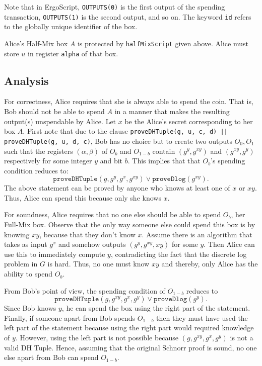 \documentclass[11pt]{article}
\newcommand{\langname}{ErgoScript\xspace}
\begin{document}
Note that in \langname, \texttt{OUTPUTS(0)} is the first output of the spending transaction, \texttt{OUTPUTS(1)} is the second output, and so on. The keyword \texttt{id} refers to the globally unique identifier of the box. 

Alice's Half-Mix box $A$ is protected by \texttt{halfMixScript} given above. Alice must store $u$ in register \texttt{alpha} of that box.


\subsection{Analysis}

For correctness, Alice requires that she is always able to spend the coin. That is, Bob should not be able to spend $A$ in a manner that makes the resulting output(s) unspendable by Alice.
Let $x$ be the Alice's secret corresponding to her box $A$. First note that due to the clause 
\texttt{proveDHTuple(g, u, c, d) || proveDHTuple(g, u, d, c)}, Bob has no choice but to create two outputs $O_0, O_1$ such that the registers $(\alpha, \beta)$ of $O_b$ and $O_{1-b}$ contain $(g^y, g^{xy})$ and $(g^{xy}, g^y)$ respectively for some integer $y$ and bit $b$. This implies that that $O_b$'s spending condition reduces to:
$$\texttt{proveDHTuple}(g, g^{y}, g^x, g^{xy}) \lor \texttt{proveDlog}(g^{xy}).$$ 
The above statement can be proved by anyone who knows at least one of $x$ or $xy$. 
Thus, Alice can spend this because only she knows $x$. 

For soundness, Alice requires that no one else should be able to spend $O_b$, her Full-Mix box. Observe that the only way someone else could spend this box is by knowing $xy$, because that they don't know $x$. Assume there is an algorithm that takes as input $g^x$ and somehow outputs $(g^y, g^{xy}, xy)$ for some $y$. Then Alice can use this to immediately compute $y$, contradicting the fact that the discrete log problem in $G$ is hard. Thus, no one must know $xy$ and thereby, only Alice has the ability to spend $O_b$.

From Bob's point of view, the spending condition of $O_{1-b}$ reduces to 
$$\texttt{proveDHTuple}(g, g^{xy}, g^x, g^{y}) \lor \texttt{proveDlog}(g^{y}).$$
Since Bob knows $y$, he can spend the box using the right part of the statement. Finally, if someone apart from Bob spends $O_{1-b}$ then they must have used the left part of the statement because using the right part would required knowledge of $y$. However, using the left part is not possible because $(g, g^{xy}, g^x, g^{y})$ is not a valid DH Tuple. Hence, assuming that the original Schnorr proof is sound, no one else apart from Bob can spend $O_{1-b}$.
\end{document}
